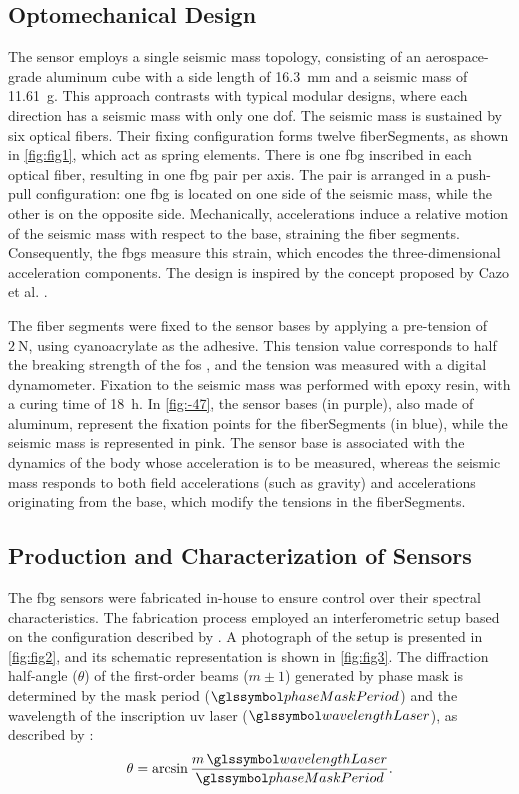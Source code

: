 \documentclass[sensors,article,accept,pdftex,moreauthors]{Definitions/mdpi}
\begin{document}
\subsection{Optomechanical Design}

The sensor employs a single seismic mass topology, consisting of an aerospace-grade aluminum cube with a side length of \SI{16.3}{\mm} and a seismic mass of \SI{11.61}{\gram}. This approach contrasts with typical modular designs, where each direction has a seismic mass with only one \gls{dof}. The seismic mass is sustained by six optical fibers. Their fixing configuration forms twelve \glspl{fiberSegment}, as shown in \cref{fig:fig1}, which act as spring elements. There is one \gls{fbg} inscribed in each optical fiber, resulting in one \gls{fbg} pair per axis. The pair is arranged in a push-pull configuration: one \gls{fbg} is located on one side of the seismic mass, while the other is on the opposite side. Mechanically, accelerations induce a relative motion of the seismic mass with respect to the base, straining the fiber segments. Consequently, the \glspl{fbg} measure this strain, which encodes the three-dimensional acceleration components. The design is inspired by the concept proposed by Cazo et al. \citep{Cazo2008}.

The fiber segments were fixed to the sensor bases by applying a pre-tension of $\SI{2}{\newton}$, using cyanoacrylate as the adhesive. This tension value corresponds to half the breaking strength of the \glspl{fo} \cite{Antunes2008}, and the tension was measured with a digital dynamometer. Fixation to the seismic mass was performed with epoxy resin, with a curing time of \SI{18}{\hour}. In \cref{fig:-47}, the sensor bases (in purple), also made of aluminum, represent the fixation points for the \glspl{fiberSegment} (in blue), while the seismic mass is represented in pink. The sensor base is associated with the dynamics of the body whose acceleration is to be measured, whereas the seismic mass responds to both field accelerations (such as gravity) and accelerations originating from the base, which modify the tensions in the \glspl{fiberSegment}.

\subsection{Production and Characterization of  Sensors}

The \gls{fbg} sensors were fabricated in-house to ensure control over their spectral characteristics. The fabrication process employed an interferometric setup based on the configuration described by \cite{Barbosa2000}. A photograph of the setup is presented in \cref{fig:fig2}, and its schematic representation is shown in \cref{fig:fig3}.
The diffraction half-angle ($\theta$) of the first-order beams ($m\pm 1$) generated by phase mask is determined by the mask period ($\phaseMaskPeriod$) and the wavelength of the inscription \gls{uv} laser ($\wavelengthLaser$), as described by \citep{Kashyap2010}:
\begin{equation}
	\theta=\arcsin\frac{m\,\wavelengthLaser}{\phaseMaskPeriod}.\label{eq:-117}
\end{equation}
\end{document}

